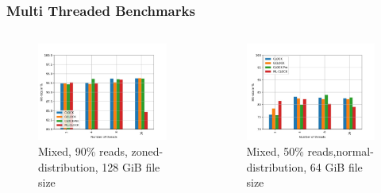 \documentclass[
	aspectratio=169,
	compress,
]{beamer}
\newcommand{\navframetitle}[1]{\frametitle{#1\hfill{\footnotesize\lastsection{}}}}
\begin{document}
\begin{frame}[fragile]
	\navframetitle{Multi Threaded Benchmarks}

	\begin{columns}
		\begin{column}{0.5\textwidth}
			\begin{figure}[ht]
    			\centering
    			\includegraphics[width=\textwidth]{multi_128_gb_rw_90to10_zoned.jpg}
        		\caption{Mixed, 90\% reads, zoned-distribution, 128 GiB file size}
        		\label{fig:rw_90to10 128 zoned}
			\end{figure}
		\end{column}
		\begin{column}{0.5\textwidth}
			\begin{figure}[ht]
    			\centering
    			\includegraphics[width=\textwidth]{multi_64_gb_rw_50to50_normal.jpg}
        		\caption{Mixed, 50\% reads,normal-distribution, 64 GiB file size}
        		\label{fig:rw_50to50 64 normal}
			\end{figure}			
		\end{column}
	\end{columns}
\end{frame}
\end{document}
